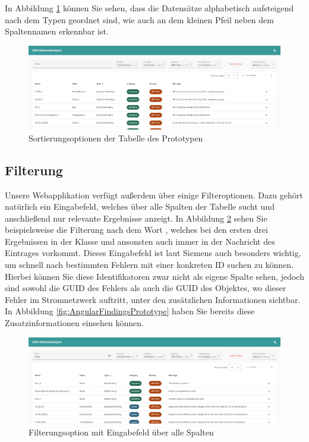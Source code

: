  In Abbildung \ref{fig:AngularFindingsSortingTypePrototype} können Sie sehen, dass die Datensätze alphabetisch aufsteigend nach dem Typen geordnet sind, wie auch an dem kleinen Pfeil neben dem Spaltennamen erkennbar ist.

\begin{figure}
    \centering
    \includegraphics[width=1\textwidth]{content/img/Empire/Frontend/Angular_Findings_Sorting_Type_Prototype.png}
    \caption{Sortierungsoptionen der Tabelle des Prototypen}
    \label{fig:AngularFindingsSortingTypePrototype}
\end{figure}
\FloatBarrier

\subsection{Filterung}

Unsere Webapplikation verfügt außerdem über einige Filteroptionen. Dazu gehört natürlich ein Eingabefeld, welches über alle Spalten der Tabelle sucht und anschließend nur relevante Ergebnisse anzeigt. In Abbildung \ref{fig:AngularFindingsFilteringNodePrototype} sehen Sie beispielsweise die Filterung nach dem Wort , welches bei den ersten drei Ergebnissen in der Klasse und ansonsten auch immer in der Nachricht des Eintrages vorkommt. Dieses Eingabefeld ist laut Siemens auch besonders wichtig, um schnell nach bestimmten Fehlern mit einer konkreten ID suchen zu können. Hierbei können Sie diese Identifikatoren zwar nicht als eigene Spalte sehen, jedoch sind sowohl die GUID des Fehlers als auch die GUID des Objektes, wo dieser Fehler im Stromnetzwerk auftritt, unter den zusätzlichen Informationen sichtbar. In Abbildung \ref{fig:AngularFindingsPrototype} haben Sie bereits diese Zusatzinformationen einsehen können.

\begin{figure}
    \centering
    \includegraphics[width=1\textwidth]{content/img/Empire/Frontend/Angular_Findings_Filtering_Node_Prototype.png}
    \caption{Filterungsoption mit Eingabefeld über alle Spalten}
    \label{fig:AngularFindingsFilteringNodePrototype}
\end{figure}
\FloatBarrier


